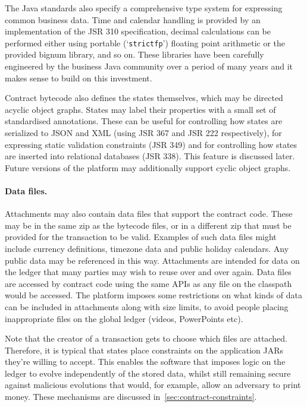 \documentclass{article}
\begin{document}
The Java standards also specify a comprehensive type system for expressing common business data. Time and calendar
handling is provided by an implementation of the JSR 310 specification, decimal calculations can be performed
either using portable (`\texttt{strictfp}') floating point arithmetic or the provided bignum library, and so on.
These libraries have been carefully engineered by the business Java community over a period of many years and it
makes sense to build on this investment.

Contract bytecode also defines the states themselves, which may be directed acyclic object graphs. States may label
their properties with a small set of standardised annotations. These can be useful for controlling how states are
serialized to JSON and XML (using JSR 367 and JSR 222 respectively), for expressing static validation constraints
(JSR 349) and for controlling how states are inserted into relational databases (JSR 338). This feature is
discussed later. Future versions of the platform may additionally support cyclic object graphs.

\paragraph{Data files.}Attachments may also contain data files that support the contract code. These may be in the
same zip as the bytecode files, or in a different zip that must be provided for the transaction to be valid.
Examples of such data files might include currency definitions, timezone data and public holiday calendars. Any
public data may be referenced in this way. Attachments are intended for data on the ledger that many parties may
wish to reuse over and over again. Data files are accessed by contract code using the same APIs as any file on the
classpath would be accessed. The platform imposes some restrictions on what kinds of data can be included in
attachments along with size limits, to avoid people placing inappropriate files on the global ledger (videos,
PowerPoints etc).

Note that the creator of a transaction gets to choose which files are attached. Therefore, it is typical that
states place constraints on the application JARs they're willing to accept. This enables the software that imposes
logic on the ledger to evolve independently of the stored data, whilst still remaining secure against malicious
evolutions that would, for example, allow an adversary to print money. These mechanisms are discussed
in~\cref{sec:contract-constraints}.
\end{document}
